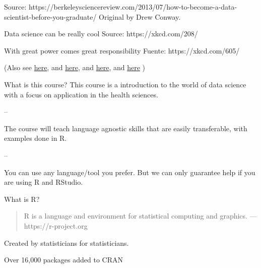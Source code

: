 \documentclass[
  ignorenonframetext,
]{beamer}
\begin{document}
\begin{frame}
Source:
https://berkeleysciencereview.com/2013/07/how-to-become-a-data-scientist-before-you-graduate/
Original by Drew Conway.
\end{frame}

\begin{frame}{Data science can be really cool}
\label{data-science-can-be-really-cool}
Source: https://xkcd.com/208/
\end{frame}

\begin{frame}{With great power comes great responsibility}
\label{with-great-power-comes-great-responsibility}
Fuente: https://xkcd.com/605/
\end{frame}

\begin{frame}
(Also see
\href{https://www.amstat.org/asa/News/New-Report-Highlights-Growing-Demand-for-Data-Science-Analytics-Talent.aspx}{here},
and \href{https://www.ibm.com/downloads/cas/3RL3VXGA}{here}, and
\href{https://www.forbes.com/sites/gilpress/2021/06/27/salaries-and-job-opportunities-for-data-scientists-continue-to-rise/}{here},
and \href{https://www.glassdoor.com/research/job-market-report/}{here} )
\end{frame}

\begin{frame}{What is this course?}
\label{what-is-this-course}
This course is a introduction to the world of data science with a focus
on application in the health sciences.

--

The course will teach language agnostic skills that are easily
transferable, with examples done in R.

--

You can use any language/tool you prefer. But we can only guarantee help
if you are using R and RStudio.
\end{frame}

\begin{frame}{What is R?}
\label{what-is-r}
\begin{quote}
R is a language and environment for statistical computing and graphics.
---https://r-project.org
\end{quote}

Created by statisticians for statisticians.

Over 16,000 packages added to CRAN
\end{frame}
\end{document}
